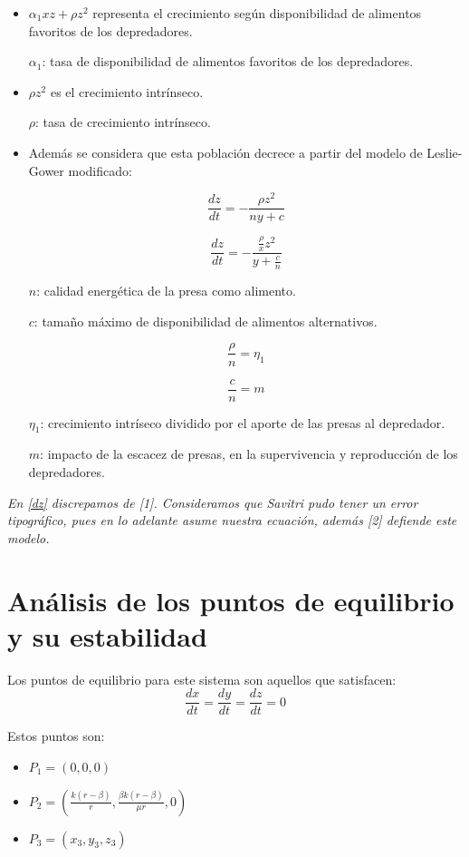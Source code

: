 \documentclass{wscpaperproc}
\theoremstyle{wsc}
\begin{document}
\begin{itemize}
	\item $\alpha_1 xz+\rho z^2$ representa el crecimiento según disponibilidad de alimentos favoritos de los depredadores.

	      $\alpha_1$: tasa de disponibilidad de alimentos favoritos de los depredadores.

	      \vspace*{0.3cm}

	\item $\rho z^2$ es el crecimiento intrínseco.

	      $\rho$: tasa de crecimiento intrínseco.

	\item Además se considera que esta población decrece a partir del modelo de Leslie-Gower modificado:

	      $$\frac{dz}{dt} =-\frac{\rho z^2}{n y+c}$$

	      $$\frac{dz}{dt} =-\frac{\frac{\rho}{x} z^2}{y+\frac{c}{n}}$$

	      $n$: calidad energética de la presa como alimento.

	      $c$: tamaño máximo de disponibilidad de alimentos alternativos.

	      \vspace*{0.5cm}

	      $$\frac{\rho}{n}=\eta_1$$

	      $$\frac{c}{n}=m$$

	      $\eta_1$: crecimiento intríseco dividido por el aporte de las presas al depredador.

	      $m$: impacto de la escacez de presas, en la supervivencia y reproducción de los depredadores.
\end{itemize}
\vspace*{3cm}
{\it En \ref*{dz} discrepamos de [1]. Consideramos que Savitri pudo tener un error tipográfico, pues en lo adelante asume nuestra
ecuación, además [2] defiende este modelo.}

\section*{Análisis de los puntos de equilibrio y su estabilidad}

Los puntos de equilibrio para este sistema son aquellos que satisfacen:
$$\frac{dx}{dt}=\frac{dy}{dt}=\frac{dz}{dt}=0$$

Estos puntos son:
\begin{itemize}
	\item $P_1=(0, 0, 0)$
	\item $P_2=(\frac{k(r-\beta)}{r}, \frac{\beta k(r-\beta)}{\mu r}, 0)$
	\item $P_3=(x_3, y_3, z_3)$
\end{itemize}
\end{document}
